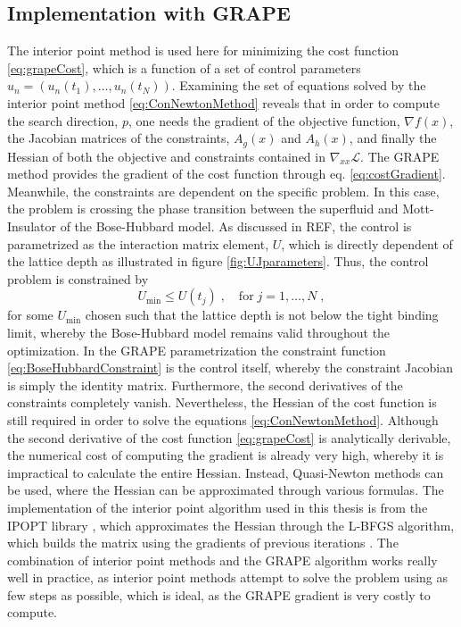 \subsection{Implementation with GRAPE}
The interior point method is used here for minimizing the cost function \eqref{eq:grapeCost}, which is a function of a set of control parameters $u_n = \left( u_n (t_1) , \ldots , u_n (t_N)  \right)$. Examining the set of equations solved by the interior point method \eqref{eq:ConNewtonMethod} reveals that in order to compute the search direction, $p$, one needs the gradient of the objective function, $\nabla f(x)$, the Jacobian matrices of the constraints, $A_g (x)$ and $A_h (x)$, and finally the Hessian of both the objective and constraints contained in $\nabla_{xx} \mathcal{L}$.
The GRAPE method provides the gradient of the cost function through eq. \eqref{eq:costGradient}. 
Meanwhile, the constraints are dependent on the specific problem. In this case, the problem is crossing the phase transition between the superfluid and Mott-Insulator of the Bose-Hubbard model. As discussed in REF, the control is parametrized as the interaction matrix element, $U$, which is directly dependent of the lattice depth as illustrated in figure \ref{fig:UJparameters}. Thus, the control problem is constrained by 
\begin{equation}
	U_{\mathrm{min}} \leq U(t_j) \; , \quad \mathrm{for} \; j = 1 , \ldots , N \; ,
	\label{eq:BoseHubbardConstraint}
\end{equation} 
for some $U_{\mathrm{min}}$ chosen such that the lattice depth is not below the tight binding limit, whereby the Bose-Hubbard model remains valid throughout the optimization. In the GRAPE parametrization the constraint function \eqref{eq:BoseHubbardConstraint} is the control itself, whereby the constraint Jacobian is simply the identity matrix. 
Furthermore, the second derivatives of the constraints completely vanish. Nevertheless, the Hessian of the cost function is still required in order to solve the equations \eqref{eq:ConNewtonMethod}. Although the second derivative of the cost function \eqref{eq:grapeCost} is analytically derivable, the numerical cost of computing the gradient is already very high, whereby it is impractical to calculate the entire Hessian. Instead, Quasi-Newton methods can be used, where the Hessian can be approximated through various formulas. The implementation of the interior point algorithm used in this thesis is from the IPOPT library \cite{Wachter2006}, which approximates the Hessian through the L-BFGS algorithm, which builds the matrix using the gradients of previous iterations \cite{Liu1989}. The combination of interior point methods and the GRAPE algorithm works really well in practice, as interior point methods attempt to solve the problem using as few steps as possible, which is ideal, as the GRAPE gradient is very costly to compute.


